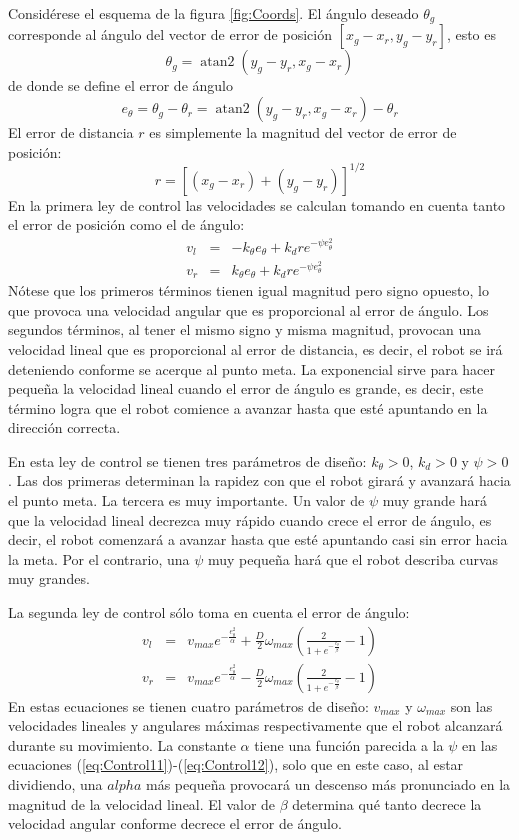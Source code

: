 \documentclass[a4paper]{article}
\DeclareMathOperator{\atantwo}{atan2}
\begin{document}
Considérese el esquema de la figura \ref{fig:Coords}. El ángulo deseado $\theta_g$ corresponde al ángulo del vector de error de posición $\left[x_g - x_r, y_g - y_r\right]$, esto es
\[\theta_g = \atantwo\left(y_g - y_r, x_g - x_r\right)\]
de donde se define el error de ángulo
\[e_{\theta} = \theta_g - \theta_r = \atantwo\left(y_g - y_r, x_g - x_r\right) - \theta_r\]
El error de distancia $r$ es simplemente la magnitud del vector de error de posición:
\[r= \left[\left(x_g - x_r\right) + \left(y_g - y_r\right)\right]^{1/2}\]
En la primera ley de control las velocidades se calculan tomando en cuenta tanto el error de posición como el de ángulo:
\begin{eqnarray}
v_{l} &=& -k_{\theta}e_{\theta} + k_d r e^{-\psi e_{\theta}^2}\label{eq:Control11}\\
v_{r} &=&  k_{\theta}e_{\theta} + k_d r e^{-\psi e_{\theta}^2}\label{eq:Control12}
\end{eqnarray}
Nótese que los primeros términos tienen igual magnitud pero signo opuesto, lo que provoca una velocidad angular que es proporcional al error de ángulo. Los segundos términos, al tener el mismo signo y misma magnitud, provocan una velocidad lineal que es proporcional al error de distancia, es decir, el robot se irá deteniendo conforme se acerque al punto meta. La exponencial sirve para hacer pequeña la velocidad lineal cuando el error de ángulo es grande, es decir, este término logra que el robot comience a avanzar hasta que esté apuntando en la dirección correcta.

En esta ley de control se tienen tres parámetros de diseño: $k_{\theta}>0$, $k_d>0$ y $\psi>0$. Las dos primeras determinan la rapidez con que el robot girará y avanzará hacia el punto meta. La tercera es muy importante. Un valor de $\psi$ muy grande hará que la velocidad lineal decrezca muy rápido cuando crece el error de ángulo, es decir, el robot comenzará a avanzar hasta que esté apuntando casi sin error hacia la meta. Por el contrario, una $\psi$ muy pequeña hará que el robot describa curvas muy grandes.  

La segunda ley de control sólo toma en cuenta el error de ángulo:
\begin{eqnarray} 
v_{l} &=& v_{max}e^{-\frac{e_{\theta}^{2}}{\alpha}} + 
\frac{D}{2}\omega_{max}\left(\frac{2}{1+e^{-\frac{e_{\theta}}{\beta}}}-1\right)\label{eq:Control21}\\
v_{r} &=& v_{max}e^{-\frac{e_{\theta}^{2}}{\alpha}} -
\frac{D}{2}\omega_{max}\left(\frac{2}{1+e^{-\frac{e_{\theta}}{\beta}}}-1\right)\label{eq:Control22}
\end{eqnarray}
En estas ecuaciones se tienen cuatro parámetros de diseño: $v_{max}$ y $\omega_{max}$ son las velocidades lineales y angulares máximas respectivamente que el robot alcanzará durante su movimiento. La constante $\alpha$ tiene una función parecida a la $\psi$ en las ecuaciones (\ref{eq:Control11})-(\ref{eq:Control12}), solo que en este caso, al estar dividiendo, una $alpha$ más pequeña provocará un descenso más pronunciado en la magnitud de la velocidad lineal. El valor de $\beta$ determina qué tanto decrece la velocidad angular conforme decrece el error de ángulo. 
\end{document}
